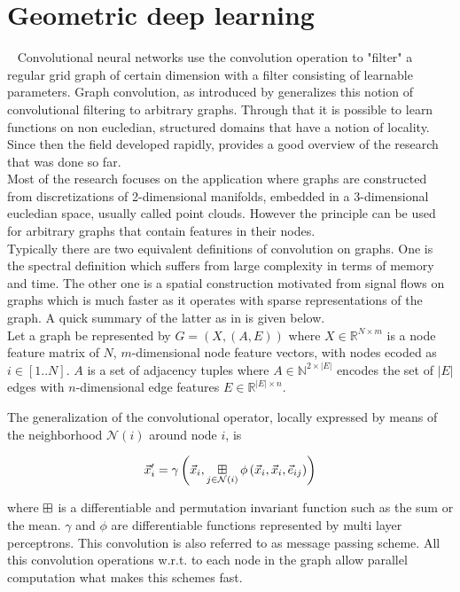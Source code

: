 \section{Geometric deep learning}~\label{sec:gcn}
\noindent Convolutional neural networks use the convolution operation to "filter" a regular grid graph of certain dimension with a filter consisting of learnable parameters. Graph convolution, as introduced by \cite{bruna2013spectral} generalizes this notion of convolutional filtering to arbitrary graphs. Through that it is possible to learn functions on non eucledian, structured domains that have a notion of locality.\\
Since then the field developed rapidly, \cite{Bronstein_2017} provides a good overview of the research that was done so far.\\
Most of the research focuses on the application where graphs are constructed from discretizations of 2-dimensional manifolds, embedded in a 3-dimensional eucledian space, usually called point clouds. However the principle can be used for arbitrary graphs that contain features in their nodes.\\
Typically there are two equivalent definitions of convolution on graphs. One is the spectral definition which suffers from large complexity in terms of memory and time. The other one is a spatial construction motivated from signal flows on graphs which is much faster as it operates with sparse representations of the graph. A quick summary of the latter as in \cite{gilmer2017neural} is given below. \\

Let a graph be represented by $G=(X, (A, E))$ where $X\in \mathbb{R}^{N\times m}$ is a node feature matrix of $N$, $m$-dimensional node feature vectors, with nodes ecoded as $i \in[1..N]$. $A$ is a set of adjacency tuples where $A\in \mathbb{N}^{2\times |E|}$ encodes the set of $|E|$ edges with $n$-dimensional edge features $E \in \mathbb{R}^{|E|\times n}$.

The generalization of the convolutional operator, locally expressed by means of the neighborhood $\mathcal{N}(i)$ around node $i$, is

\begin{align}
	\vec{x}_i^\prime = \gamma \left(\vec{x}_i, \operatorname*{\boxplus}_{j \in \mathcal{N}(i)}  \phi \left(\vec{x}_i, \vec{x}_i, \vec{e}_{ij} \right) \right)
\end{align}

where $\operatorname*{\boxplus}$ is a differentiable and permutation invariant function such as the sum or the mean. $\gamma$ and $\phi$ are differentiable functions represented by multi layer perceptrons. This convolution is also referred to as message passing scheme. All this convolution operations w.r.t. to each node in the graph allow parallel computation what makes this schemes fast.



